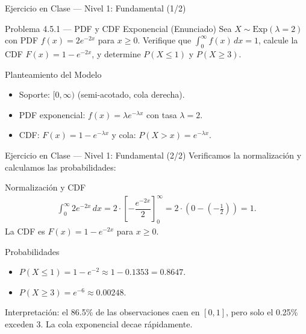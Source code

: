 \documentclass[10pt, aspectratio=169]{beamer}
\begin{document}
\begin{frame}{Ejercicio en Clase --- Nivel 1: Fundamental (1/2)}
  \footnotesize
  \begin{block}{Problema 4.5.1 --- PDF y CDF Exponencial (Enunciado)}
    Sea $X \sim \text{Exp}(\lambda = 2)$ con PDF $f(x) = 2e^{-2x}$ para $x \ge 0$. Verifique que $\int_{0}^{\infty} f(x)\,dx = 1$, calcule la CDF $F(x) = 1 - e^{-2x}$, y determine $P(X \le 1)$ y $P(X \ge 3)$.
  \end{block}

  \vspace{0.15cm}
  \pause
  \begin{alertblock}{Planteamiento del Modelo}
    \begin{itemize}\itemsep=0.04cm
      \item Soporte: $[0, \infty)$ (semi-acotado, cola derecha).
      \item PDF exponencial: $f(x) = \lambda e^{-\lambda x}$ con tasa $\lambda = 2$.
      \item CDF: $F(x) = 1 - e^{-\lambda x}$ y cola: $P(X > x) = e^{-\lambda x}$.
    \end{itemize}
  \end{alertblock}
\end{frame}

\begin{frame}{Ejercicio en Clase --- Nivel 1: Fundamental (2/2)}
  \scriptsize
  Verificamos la normalización y calculamos las probabilidades: \pause

  \vspace{0.05cm}
  \begin{block}{Normalización y CDF}
    \begin{align*}
      \int_{0}^{\infty} 2e^{-2x}\,dx = 2 \cdot \left[ -\dfrac{e^{-2x}}{2} \right]_{0}^{\infty} = 2 \cdot (0 - (-\tfrac{1}{2})) = 1.
    \end{align*}
    La CDF es $F(x) = 1 - e^{-2x}$ para $x \ge 0$.
  \end{block}

  \vspace{0.05cm}
  \pause
  \begin{alertblock}{Probabilidades}
    \scriptsize
    \begin{itemize}\itemsep=0.04cm
      \item $P(X \le 1) = 1 - e^{-2} \approx 1 - 0.1353 = 0.8647$.
      \item $P(X \ge 3) = e^{-6} \approx 0.00248$.
    \end{itemize}
    Interpretación: el 86.5\% de las observaciones caen en $[0, 1]$, pero solo el 0.25\% exceden 3. La cola exponencial decae rápidamente.
  \end{alertblock}
\end{frame}
\end{document}
